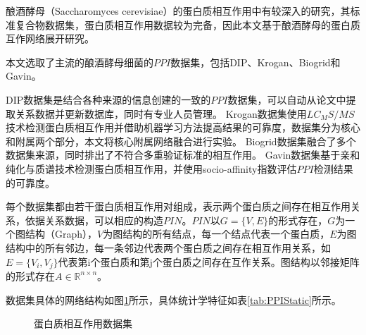 酿酒酵母（Saccharomyces cerevisiae）的蛋白质相互作用中有较深入的研究，其标准复合物数据集，蛋白质相互作用数据较为完备，因此本文基于酿酒酵母的蛋白质互作网络展开研究。

本文选取了主流的酿酒酵母细菌的$PPI$数据集，包括DIP\cite{salwinski_database_2004}、Krogan\cite{krogan_global_2006}、Biogrid\cite{stark_biogrid_2006}和Gavin\cite{gavin_proteome_2006}。

DIP数据集是结合各种来源的信息创建的一致的$PPI$数据集，可以自动从论文中提取关系数据并更新数据库，同时有专业人员管理。
Krogan数据集使用$LC_MS/MS$技术检测蛋白质相互作用并借助机器学习方法提高结果的可靠度，数据集分为核心和附属两个部分，本文将核心附属网络融合进行实验。
Biogrid数据集融合了多个数据集来源，同时排出了不符合多重验证标准的相互作用。
Gavin数据集基于亲和纯化与质谱技术检测蛋白质相互作用，并使用socio-affinity指数评估$PPI$检测结果的可靠度。

每个数据集都由若干蛋白质相互作用对组成，表示两个蛋白质之间存在相互作用关系，依据关系数据，可以相应的构造$PIN$。$PIN$以$G=\{V,E\}$的形式存在，$G$为一个图结构（Graph），$V$为图结构的所有结点，每一个结点代表一个蛋白质，$E$为图结构中的所有邻边，每一条邻边代表两个蛋白质之间存在相互作用关系，如$E=\{V_i,V_j\}$代表第i个蛋白质和第j个蛋白质之间存在互作关系。图结构以邻接矩阵的形式存在$A\in \mathbb{R}^{n\times n}$。

数据集具体的网络结构如图\ref{fig:ppi-datasets}所示，具体统计学特征如表\ref{tab:PPIStatic}所示。

\begin{figure}[htbp]
    \centering
    \vskip0.5cm
    \caption{蛋白质相互作用数据集}
    \label{fig:ppi-datasets}
\end{figure}


